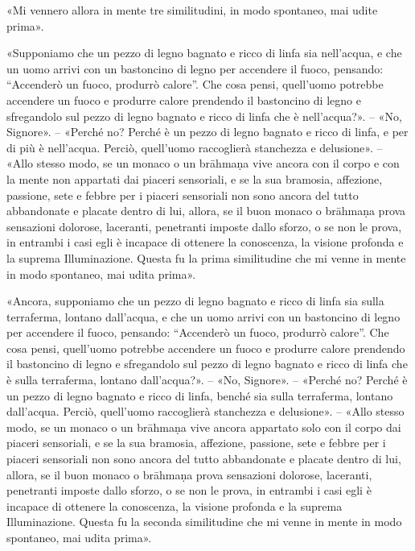 
«Mi vennero allora in mente tre similitudini, in modo spontaneo, mai udite
prima».

«Supponiamo che un pezzo di legno bagnato e ricco di linfa sia nell’acqua, e che
un uomo arrivi con un bastoncino di legno per accendere il fuoco, pensando:
“Accenderò un fuoco, produrrò calore”. Che cosa pensi, quell’uomo potrebbe
accendere un fuoco e produrre calore prendendo il bastoncino di legno e
sfregandolo sul pezzo di legno bagnato e ricco di linfa che è nell’acqua?». –
«No, Signore». – «Perché no? Perché è un pezzo di legno bagnato e ricco di
linfa, e per di più è nell’acqua. Perciò, quell’uomo raccoglierà stanchezza e
delusione». – «Allo stesso modo, se un monaco o un brāhmaṇa vive ancora con il
corpo e con la mente non appartati dai piaceri sensoriali, e se la sua bramosia,
affezione, passione, sete e febbre per i piaceri sensoriali non sono ancora del
tutto abbandonate e placate dentro di lui, allora, se il buon monaco o brāhmaṇa
prova sensazioni dolorose, laceranti, penetranti imposte dallo sforzo, o se non
le prova, in entrambi i casi egli è incapace di ottenere la conoscenza, la
visione profonda e la suprema Illuminazione. Questa fu la prima similitudine che
mi venne in mente in modo spontaneo, mai udita prima».

«Ancora, supponiamo che un pezzo di legno bagnato e ricco di linfa sia sulla
terraferma, lontano dall’acqua, e che un uomo arrivi con un bastoncino di legno
per accendere il fuoco, pensando: “Accenderò un fuoco, produrrò calore”. Che
cosa pensi, quell’uomo potrebbe accendere un fuoco e produrre calore prendendo
il bastoncino di legno e sfregandolo sul pezzo di legno bagnato e ricco di linfa
che è sulla terraferma, lontano dall’acqua?». – «No, Signore». – «Perché no?
Perché è un pezzo di legno bagnato e ricco di linfa, benché sia sulla
terraferma, lontano dall’acqua. Perciò, quell’uomo raccoglierà stanchezza e
delusione». – «Allo stesso modo, se un monaco o un brāhmaṇa vive ancora
appartato solo con il corpo dai piaceri sensoriali, e se la sua bramosia,
affezione, passione, sete e febbre per i piaceri sensoriali non sono ancora del
tutto abbandonate e placate dentro di lui, allora, se il buon monaco o brāhmaṇa
prova sensazioni dolorose, laceranti, penetranti imposte dallo sforzo, o se non
le prova, in entrambi i casi egli è incapace di ottenere la conoscenza, la
visione profonda e la suprema Illuminazione. Questa fu la seconda similitudine
che mi venne in mente in modo spontaneo, mai udita prima».

